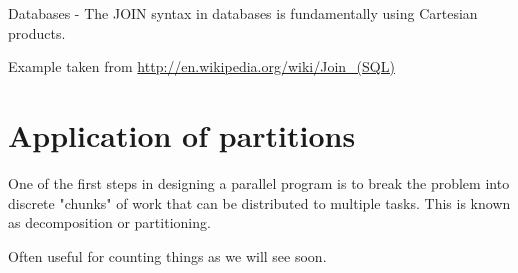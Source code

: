 \documentclass[12pt]{article}
\begin{document}
Databases - The JOIN syntax in databases is fundamentally using Cartesian products.

Example taken from \href{http://en.wikipedia.org/wiki/Join\_(SQL)}{http://en.wikipedia.org/wiki/Join\_(SQL)}

\section*{Application of partitions}

One of the first steps in designing a parallel program is to break the problem into discrete "chunks" of work that can be distributed to multiple tasks. This is known as decomposition or partitioning.

Often useful for counting things as we will see soon.
\end{document}

